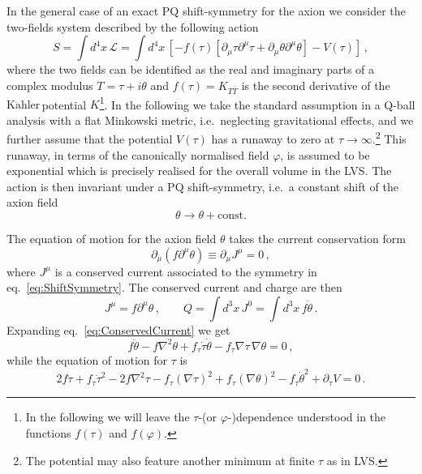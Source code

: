 \documentclass[11pt,a4paper]{article}
\newcommand{\Kahler}{\ensuremath{\text{K}\ddot{\text{a}}\text{hler}\,}}
\begin{document}
In the general case of an exact PQ shift-symmetry for the axion we consider the two-fields system described by the following action
\begin{equation}
S = \int d^4 x\, \mathcal{L} = \int d^4x\, \left[- f(\tau) \left[\partial_\mu \tau \partial^\mu \tau + \partial_\mu \theta \partial^\mu \theta\right] - V(\tau)\right] \,,
\end{equation}
where the two fields can be identified as the real and imaginary parts of a complex modulus $T = \tau + i \theta$ and $f(\tau) = K_{T \overline{T}}$ is the second derivative of the \Kahler potential $K$\footnote{In the following we will leave the $\tau$-(or $\varphi$-)dependence understood in the functions $f(\tau)$ and $f(\varphi)$.}. In the following we take the standard assumption in a Q-ball analysis with a flat Minkowski metric, i.e.~neglecting gravitational effects, and we further assume that the potential $V(\tau)$ has a runaway to zero at $\tau\rightarrow \infty.$\footnote{The potential may also feature another minimum at finite $\tau$ as in LVS.} This runaway, in terms of the canonically normalised field $\varphi$, is assumed to be exponential which is precisely realised for the overall volume in the LVS. The action is then invariant under a PQ shift-symmetry, i.e.~a constant shift of the axion field
\begin{equation}
\label{eq:ShiftSymmetry}
\theta \rightarrow \theta + \text{const.}
\end{equation}

The equation of motion for the axion field $\theta$ takes the current conservation form
\begin{equation}
\label{eq:ConservedCurrent}
\partial_\mu \left(f \partial^\mu \theta\right) \equiv \partial_\mu J^\mu = 0\,,
\end{equation}
where $J^\mu$ is a conserved current associated to the symmetry in eq.~\eqref{eq:ShiftSymmetry}. The conserved current and charge are then
\begin{equation}
J^\mu = f \partial^\mu \theta \,, \qquad Q = \int d^3x\, J^0 = \int d^3x\, f \dot\theta\,.
\end{equation}
Expanding eq.~\eqref{eq:ConservedCurrent} we get
\begin{equation}
\label{eq:EomTheta}
f \ddot\theta - f \nabla^2 \theta + f_\tau \dot\tau\dot\theta - f_\tau \nabla\tau\,\nabla\theta = 0 \,,
\end{equation}
while the equation of motion for $\tau$ is
\begin{equation}
\label{eq:EomTau}
2 f \ddot\tau + f_\tau \dot\tau^2 - 2 f \nabla^2 \tau - f_\tau \left(\nabla \tau\right)^2 + f_\tau \left(\nabla \theta\right)^2 - f_\tau \dot\theta^2  + \partial_\tau V = 0 \,.
\end{equation}
\end{document}

